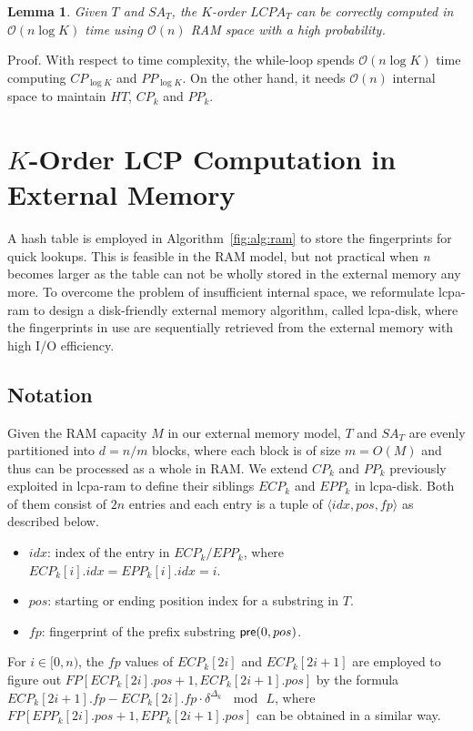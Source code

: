 \documentclass[10pt,journal,compsoc]{IEEEtran}
\newtheorem{Lemma}{Lemma}
\begin{document}
\begin{CJK*}{GBK}{song}
\begin{Lemma}
\label{thm:lcp:ram}
Given $T$ and $SA_T$, the $K$-order $LCPA_T$ can be correctly computed in $\mathcal{O}(n\log K)$ time using $\mathcal{O}(n)$ RAM space with a high probability.
\end{Lemma}
Proof. With respect to time complexity, the while-loop spends $\mathcal{O}(n\log K)$ time computing $CP_{\log K}$ and $PP_{\log K}$. On the other hand, it needs $\mathcal{O}(n)$ internal space to maintain $HT$, $CP_k$ and $PP_k$.

\section{$K$-Order LCP Computation in External Memory}\label{sec:construction_in_em}

A hash table is employed in Algorithm~\ref{fig:alg:ram} to store the fingerprints for quick lookups. This is feasible in the RAM model, but not practical when {\em n} becomes larger as the table can not be wholly stored in the external memory any more. To overcome the problem of insufficient internal space, we reformulate lcpa-ram to design a disk-friendly external memory algorithm, called lcpa-disk, where the fingerprints in use are sequentially retrieved from the external memory with high I/O efficiency.

\subsection{Notation}

Given the RAM capacity $M$ in our external memory model, $T$ and $SA_T$ are evenly partitioned into $d=n/m$ blocks, where each block is of size $m=O(M)$ and thus can be processed as a whole in RAM. We extend $CP_k$ and $PP_k$ previously exploited in lcpa-ram to define their siblings $ECP_k$ and $EPP_k$ in lcpa-disk. Both of them consist of $2n$ entries and each entry is a tuple of $\langle idx, pos, fp \rangle$ as described below.
\begin{itemize}
\item $idx$: index of the entry in $ECP_k/EPP_k$, where $ECP_k[i].idx=EPP_k[i].idx=i$.
\item $pos$: starting or ending position index for a substring in $T$.
\item $fp$: fingerprint of the prefix substring ${\sf pre}(0,pos)$.
\end{itemize}

For $i\in [0,n)$, the $fp$ values of $ECP_k[2i]$ and $ECP_k[2i+1]$ are employed to figure out $FP[ECP_k[2i].pos+1, ECP_k[2i+1].pos]$ by the formula $ECP_k[2i+1].fp - ECP_k[2i].fp \cdot \delta^{\Delta_k} \, \mod \, L$, where $FP[EPP_k[2i].pos+1, EPP_k[2i+1].pos]$ can be obtained in a similar way.


\end{CJK*}
\end{document}
